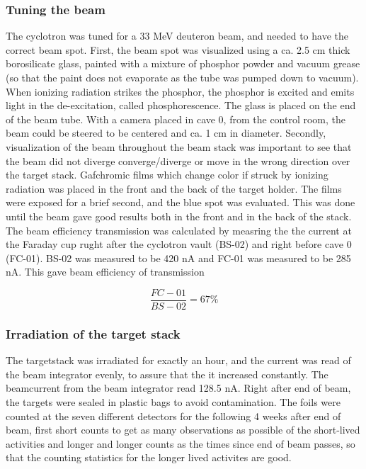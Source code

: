 \documentclass[a4paper,11pt,twoside]{book}
\begin{document}
\subsubsection{Tuning the beam}
The cyclotron was tuned for a 33 MeV deuteron beam, and needed to have the correct beam spot. First, the beam spot was visualized using a ca. 2.5 cm thick borosilicate glass, painted with a mixture of phosphor powder and vacuum grease (so that the paint does not evaporate as the tube was pumped down to vacuum). When ionizing radiation strikes the phosphor, the phosphor is excited and emits light in the de-excitation, called phosphorescence.  The glass is placed on the end of the beam tube. With a camera placed in cave 0, from the control room, the beam could be steered to be centered and ca. 1 cm in diameter. Secondly, visualization of the beam throughout the beam stack was important to see that the beam did not diverge converge/diverge or move in the wrong direction over the target stack. Gafchromic films which change color if struck by ionizing radiation was placed in the front and the back of the target holder. The films were exposed for a brief second, and the blue spot was evaluated. This was done until the beam gave good results both in the front and in the back of the stack. \\

\noindent
The beam efficiency transmission was calculated by measring the the current at the Faraday cup rught after the cyclotron vault (BS-02) and right before cave 0 (FC-01). BS-02 was measured to be 420 nA and FC-01 was measured to be 285 nA. This gave beam efficiency of transmission

$$\frac{FC-01}{BS-02}=67\% $$

\subsubsection{Irradiation of the target stack}

The targetstack was irradiated for exactly an hour, and the current was read of the beam integrator evenly, to assure that the it increased constantly. The beamcurrent from the beam integrator read 128.5 nA.  %
Right after end of beam, the targets were sealed in plastic bags to avoid contamination. The foils were counted at the seven different detectors for the following 4 weeks after end of beam, first short counts to get as many observations as possible of the short-lived activities and longer and longer counts as the times since end of beam passes, so that the counting statistics for the longer lived activites are good. 
\end{document}
